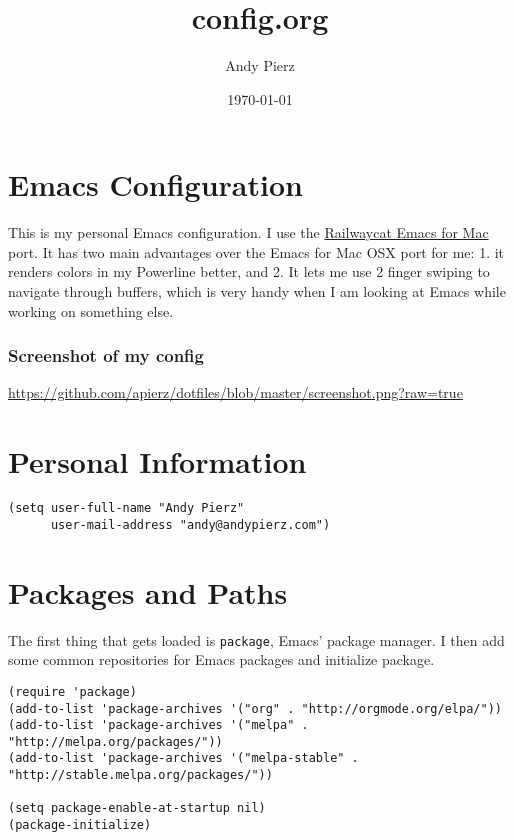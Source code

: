 \documentclass{article}
\author{Andy Pierz}
\date{\today}
\title{config.org}
\begin{document}
\maketitle

\section{Emacs Configuration}
\label{sec-1}

This is my personal Emacs configuration. I use the \href{https://github.com/railwaycat/homebrew-emacsmacport}{Railwaycat Emacs for Mac} port. It has two main advantages over the Emacs for Mac OSX port for me: 1. it renders colors in my Powerline better, and 2. It lets me use 2 finger swiping to navigate through buffers, which is very handy when I am looking at Emacs while working on something else.

\subsubsection{Screenshot of my config}
\label{sec-1-0-1}
\url{https://github.com/apierz/dotfiles/blob/master/screenshot.png?raw=true} 

\section{Personal Information}
\label{sec-2}

\begin{verbatim}
(setq user-full-name "Andy Pierz"
      user-mail-address "andy@andypierz.com")
\end{verbatim}
\section{Packages and Paths}
\label{sec-3}

The first thing that gets loaded is \texttt{package}, Emacs' package manager. I then add some common repositories for Emacs packages and initialize package.

\begin{verbatim}
(require 'package)
(add-to-list 'package-archives '("org" . "http://orgmode.org/elpa/"))
(add-to-list 'package-archives '("melpa" . "http://melpa.org/packages/"))
(add-to-list 'package-archives '("melpa-stable" .
"http://stable.melpa.org/packages/"))

(setq package-enable-at-startup nil)
(package-initialize)
\end{verbatim}
\end{document}
